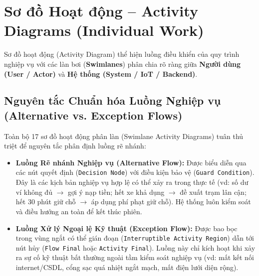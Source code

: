 \documentclass[12pt,a4paper]{article}
\begin{document}
\section{Sơ đồ Hoạt động -- Activity Diagrams (Individual Work)}

Sơ đồ hoạt động (Activity Diagram) thể hiện luồng điều khiển của quy trình nghiệp vụ với các làn bơi (\textbf{Swimlanes}) phân chia rõ ràng giữa \textbf{Người dùng (User / Actor)} và \textbf{Hệ thống (System / IoT / Backend)}.

\subsection*{Nguyên tắc Chuẩn hóa Luồng Nghiệp vụ (Alternative vs. Exception Flows)}
Toàn bộ 17 sơ đồ hoạt động phân làn (Swimlane Activity Diagrams) tuân thủ triệt để nguyên tắc phân định luồng rẽ nhánh:
\begin{itemize}[nosep]
    \item \textbf{Luồng Rẽ nhánh Nghiệp vụ (Alternative Flow):} Được biểu diễn qua các nút quyết định (\texttt{Decision Node}) với điều kiện bảo vệ (\texttt{Guard Condition}). Đây là các kịch bản nghiệp vụ hợp lệ có thể xảy ra trong thực tế (vd: số dư ví không đủ $\rightarrow$ gợi ý nạp tiền; hết xe khả dụng $\rightarrow$ đề xuất trạm lân cận; hết 30 phút giữ chỗ $\rightarrow$ áp dụng phí phạt giữ chỗ). Hệ thống luôn kiểm soát và điều hướng an toàn để kết thúc phiên.
    \item \textbf{Luồng Xử lý Ngoại lệ Kỹ thuật (Exception Flow):} Được bao bọc trong vùng ngắt có thể gián đoạn (\texttt{Interruptible Activity Region}) dẫn tới nút hủy (\texttt{Flow Final} hoặc \texttt{Activity Final}). Luồng này chỉ kích hoạt khi xảy ra sự cố kỹ thuật bất thường ngoài tầm kiểm soát nghiệp vụ (vd: mất kết nối internet/CSDL, cổng sạc quá nhiệt ngắt mạch, mất điện lưới diện rộng).
\end{itemize}
\end{document}
